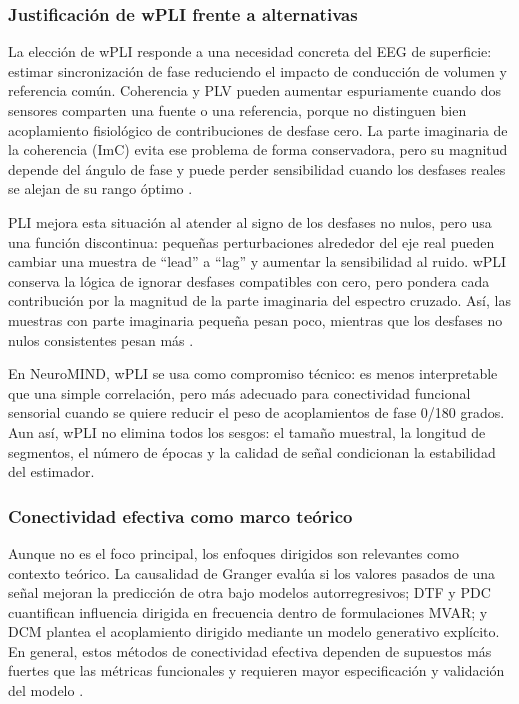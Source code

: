 \subsubsection{Justificación de wPLI frente a alternativas}

La elección de wPLI responde a una necesidad concreta del EEG de superficie: estimar sincronización de fase reduciendo el impacto de conducción de volumen y referencia común. Coherencia y PLV pueden aumentar espuriamente cuando dos sensores comparten una fuente o una referencia, porque no distinguen bien acoplamiento fisiológico de contribuciones de desfase cero. La parte imaginaria de la coherencia (ImC) evita ese problema de forma conservadora, pero su magnitud depende del ángulo de fase y puede perder sensibilidad cuando los desfases reales se alejan de su rango óptimo \citep{Vinck2011WPLI}.

PLI mejora esta situación al atender al signo de los desfases no nulos, pero usa una función discontinua: pequeñas perturbaciones alrededor del eje real pueden cambiar una muestra de ``lead'' a ``lag'' y aumentar la sensibilidad al ruido. wPLI conserva la lógica de ignorar desfases compatibles con cero, pero pondera cada contribución por la magnitud de la parte imaginaria del espectro cruzado. Así, las muestras con parte imaginaria pequeña pesan poco, mientras que los desfases no nulos consistentes pesan más \citep{Vinck2011WPLI}.

\begin{ideaclave}
\small
En NeuroMIND, wPLI se usa como compromiso técnico: es menos interpretable que una simple correlación, pero más adecuado para conectividad funcional sensorial cuando se quiere reducir el peso de acoplamientos de fase 0/180 grados. Aun así, wPLI no elimina todos los sesgos: el tamaño muestral, la longitud de segmentos, el número de épocas y la calidad de señal condicionan la estabilidad del estimador.
\end{ideaclave}


\subsubsection{Conectividad efectiva como marco teórico}

Aunque no es el foco principal, los enfoques dirigidos son relevantes como contexto teórico. La causalidad de Granger evalúa si los valores pasados de una señal mejoran la predicción de otra bajo modelos autorregresivos; DTF y PDC cuantifican influencia dirigida en frecuencia dentro de formulaciones MVAR; y DCM plantea el acoplamiento dirigido mediante un modelo generativo explícito. En general, estos métodos de conectividad efectiva dependen de supuestos más fuertes que las métricas funcionales y requieren mayor especificación y validación del modelo \citep{Cohen2014,Sanei2022}.

